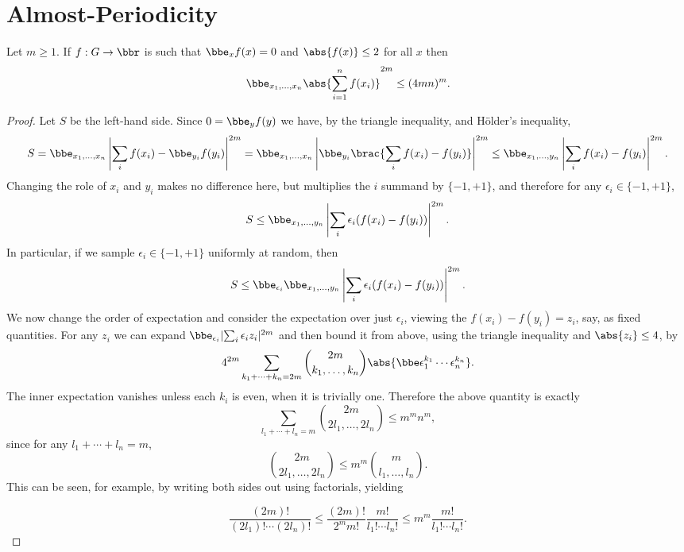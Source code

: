 \chapter{Almost-Periodicity}
\label{chap:ap}

\begin{lemma}
\label{mzi}
\leanok
Let $m\geq 1$. If $f:G\to\bbr$ is such that $\bbe_x f(x)=0$ and $\abs{f(x)}\leq 2$ for all $x$ then
\[\bbe_{x_1,\ldots,x_n} \abs{\sum_{i=1}^n f(x_i)}^{2m} \leq (4mn)^{m}.\]
\end{lemma}

\begin{proof}
\leanok
Let $S$ be the left-hand side. Since $0=\bbe_y f(y)$ we have, by the triangle inequality, and H\"{o}lder's inequality,
\[S=\bbe_{x_1,\ldots,x_n}\left\lvert \sum_i f(x_i) - \bbe_{y_i} f(y_i)\right\rvert^{2m} = \bbe_{x_1,\ldots,x_n} \left\lvert\bbe_{y_i}\brac{\sum_i f(x_i)-f(y_i)}\right\rvert^{2m}\leq \bbe_{x_1,\dots,y_n} \left\lvert \sum_i f(x_i)-f(y_i)\right\rvert^{2m}.\]
Changing the role of $x_i$ and $y_i$ makes no difference here, but multiplies the $i$ summand by $\{-1,+1\}$, and therefore for any $\epsilon_i\in\{-1,+1\}$,
\[ S \leq\bbe_{x_1,\ldots,y_n}\left\lvert \sum_i \epsilon_i(f(x_i)-f(y_i))\right\rvert^{2m}.\]
In particular, if we sample $\epsilon_i\in\{-1,+1\}$ uniformly at random, then
\[ S \leq\bbe_{\epsilon_i} \bbe_{x_1,\ldots,y_n}\left\lvert \sum_i \epsilon_i(f(x_i)-f(y_i))\right\rvert^{2m}.\]
We now change the order of expectation and consider the expectation over just $\epsilon_i$, viewing the $f(x_i)-f(y_i)=z_i$, say, as fixed quantities. For any $z_i$ we can expand $\bbe_{\epsilon_i} \lvert \sum_i \epsilon_iz_i\rvert^{2m}$ and then bound it from above, using the triangle inequality and $\abs{z_i}\leq 4$, by
\[4^{2m}\sum_{k_1+\cdots+k_n=2m}\binom{2m}{k_1,\ldots,k_n}\abs{\bbe\epsilon_1^{k_1}\cdots \epsilon_n^{k_n}}.\]
The inner expectation vanishes unless each $k_i$ is even, when it is trivially one. Therefore the above quantity is exactly
\[\sum_{l_1+\cdots+l_n=m}\binom{2m}{2l_1,\ldots,2l_n}\leq m^mn^m,\]
since for any $l_1+\cdots+l_n=m$,
\[\binom{2m}{2l_1,\ldots,2l_n}\leq m^m\binom{m}{l_1,\ldots,l_n}.\]
This can be seen, for example, by writing both sides out using factorials, yielding

\[\frac{(2m)!}{(2l_1)!\cdots (2l_n)!}\leq \frac{(2m)!}{2^mm!}\frac{m!}{l_1!\cdots l_n!}\leq m^m\frac{m!}{l_1!\cdots l_n!}.\]
\end{proof}


